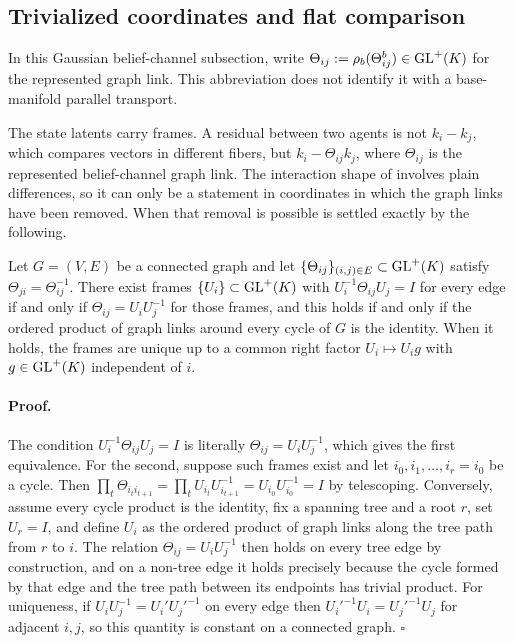 \subsection{Trivialized coordinates and flat comparison}

In this Gaussian belief-channel subsection, write
\(\Theta_{ij}:=\rho_b(\Theta_{ij}^b)\in\mathrm{GL}^+(K)\) for the represented
graph link.  This abbreviation does not identify it with a base-manifold
parallel transport.

The state latents carry frames. A residual between two agents is not $k_i-k_j$, which compares vectors in different fibers, but $k_i-\Theta_{ij}k_j$, where $\Theta_{ij}$ is the represented belief-channel graph link. The interaction shape of  involves plain differences, so it can only be a statement in coordinates in which the graph links have been removed. When that removal is possible is settled exactly by the following.

Let $G=(V,E)$ be a connected graph and let $\{\Theta_{ij}\}_{(i,j)\in E}\subset\mathrm{GL}^{+}(K)$ satisfy $\Theta_{ji}=\Theta_{ij}^{-1}$. There exist frames $\{U_i\}\subset\mathrm{GL}^{+}(K)$ with $U_i^{-1}\Theta_{ij}U_j=I$ for every edge if and only if $\Theta_{ij}=U_iU_j^{-1}$ for those frames, and this holds if and only if the ordered product of graph links around every cycle of $G$ is the identity. When it holds, the frames are unique up to a common right factor $U_i\mapsto U_ig$ with $g\in\mathrm{GL}^{+}(K)$ independent of $i$. 

\paragraph{Proof.}
The condition $U_i^{-1}\Theta_{ij}U_j=I$ is literally $\Theta_{ij}=U_iU_j^{-1}$, which gives the first equivalence. For the second, suppose such frames exist and let $i_0,i_1,\dots,i_r=i_0$ be a cycle. Then $\prod_{t}\Theta_{i_ti_{t+1}}=\prod_t U_{i_t}U_{i_{t+1}}^{-1}=U_{i_0}U_{i_0}^{-1}=I$ by telescoping. Conversely, assume every cycle product is the identity, fix a spanning tree and a root $r$, set $U_r=I$, and define $U_i$ as the ordered product of graph links along the tree path from $r$ to $i$. The relation $\Theta_{ij}=U_iU_j^{-1}$ then holds on every tree edge by construction, and on a non-tree edge it holds precisely because the cycle formed by that edge and the tree path between its endpoints has trivial product. For uniqueness, if $U_iU_j^{-1}=U_i'U_j'^{-1}$ on every edge then $U_i'^{-1}U_i=U_j'^{-1}U_j$ for adjacent $i,j$, so this quantity is constant on a connected graph. $\square$

